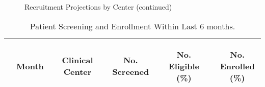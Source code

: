 \documentclass[dvips, 10pt]{article}
\begin{document}
\begin{figure}
\caption{Recruitment Projections by Center (continued)}
\end{figure}
\clearpage
\begin{table}[t]
\caption
{ Patient Screening and Enrollment Within Last 6 months. }
\begin{center}
\begin{tabular}{ @{}l@{}
@{}l@{}@{}p{1.5em}@{}@{}c@{}@{}p{1.5em}@{}@{}c@{}@{}p{1.5em}@{}@{}c@{}@{}p{1.5em}@{}@{}c@{}
}
\hline

& \parbox{6em}{\begin{center}Month\end{center}} && \parbox{6em}{\begin{center}Clinical Center\end{center}} && \parbox{6em}{\begin{center}No. Screened\end{center}} && \parbox{6em}{\begin{center}No. Eligible (\%)\end{center}} && \parbox{6em}{\begin{center}No. Enrolled (\%)\end{center}} \\

\hline


\end{tabular}
\end{center}
\end{table}
\end{document}
